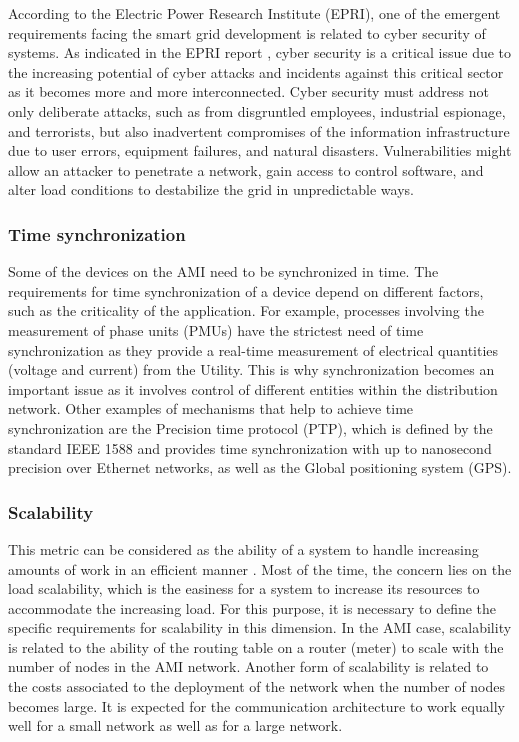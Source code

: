 \documentclass[11pt,draftclsnofoot,onecolumn]{IEEEtran}
\begin{document}
According to the Electric Power Research Institute (EPRI), one of the emergent requirements facing the smart grid development is related to cyber security of systems. As indicated in the EPRI report \cite{EPRI2009}, cyber security is a critical issue due to the increasing potential of cyber attacks and incidents against this critical sector as it becomes more and more interconnected. Cyber security must address not only deliberate attacks, such as from disgruntled employees, industrial espionage, and terrorists, but also inadvertent compromises of the information infrastructure due to user errors, equipment failures, and natural disasters. Vulnerabilities might allow an attacker to penetrate a network, gain access to control software, and alter load conditions to destabilize the grid in unpredictable ways.

\subsubsection{Time synchronization}
Some of the devices on the AMI need to be synchronized in time. The requirements for time synchronization of a device depend on different factors, such as the criticality of the application. For example, processes involving the measurement of phase units (PMUs) have the strictest need of time synchronization as they provide a real-time measurement of electrical quantities (voltage and current) from the Utility. This is why synchronization becomes an important issue as it involves control of different entities within the distribution network. Other examples of mechanisms that help to achieve time synchronization are the Precision time protocol (PTP), which is defined by the standard IEEE 1588 and provides time synchronization with up to nanosecond precision over Ethernet networks, as well as the Global positioning system (GPS).

\subsubsection{Scalability}
This metric can be considered as the ability of a system to handle increasing amounts of work in an efficient manner \cite{Zhou2012}. Most of the time, the concern lies on the load scalability, which is the easiness for a system to increase its resources to accommodate the increasing load. For this purpose, it is necessary to define the specific requirements for scalability in this dimension. In the AMI case, scalability is related to the ability of the routing table on a router (meter) to scale with the number of nodes in the AMI network. Another form of scalability is related to the costs associated to the deployment of the network when the number of nodes becomes large. It is expected for the communication architecture to work equally well for a small network as well as for a large network.
\end{document}
